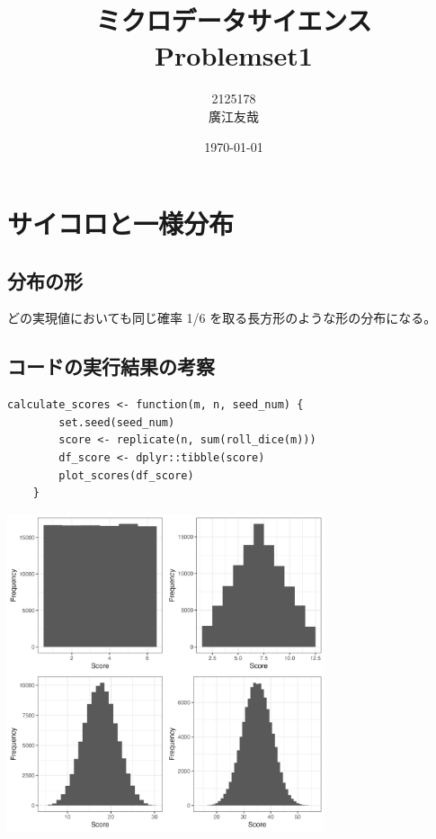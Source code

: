 \documentclass{article}
\begin{document}
\title{ミクロデータサイエンス\\Problemset1}
\author{2125178\\廣江友哉}
\date{\today}
\maketitle


\section{サイコロと一様分布}

\subsection{分布の形}

どの実現値においても同じ確率 1/6 を取る長方形のような形の分布になる。

\subsection{コードの実行結果の考察}

\begin{lstlisting}[]
	calculate_scores <- function(m, n, seed_num) {
		set.seed(seed_num)
		score <- replicate(n, sum(roll_dice(m)))
		df_score <- dplyr::tibble(score)
		plot_scores(df_score)
	}

\end{lstlisting}

	\begin{center}
		\includegraphics[width=0.7\textwidth]{1-2_plot.png}
	\end{center}
\end{document}
